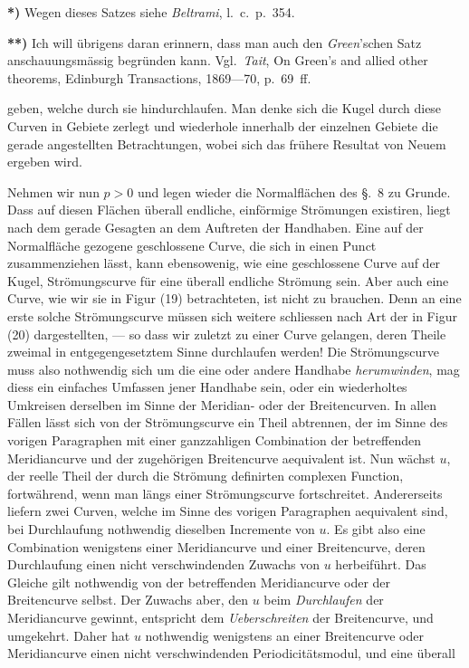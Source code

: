 \documentclass{article}
\begin{document}
\textbf{*)} Wegen dieses Satzes siehe \emph{Beltrami}, l.\ c.\ p.~354.

\textbf{**)} Ich will übrigens daran erinnern, dass man auch den \emph{Green}'schen Satz anschauungsmässig begründen kann. Vgl.\ \emph{Tait}, On Green's and allied other theorems, Edinburgh Transactions, 1869---70, p.~69~ff.

geben, welche durch sie hindurchlaufen. Man denke sich die Kugel durch diese Curven in Gebiete zerlegt und wiederhole innerhalb der einzelnen Gebiete die gerade angestellten Betrachtungen, wobei sich das frühere Resultat von Neuem ergeben wird.

Nehmen wir nun $p > 0$ und legen wieder die Normalflächen des §.~8 zu Grunde. Dass auf diesen Flächen überall endliche, einförmige Strömungen existiren, liegt nach dem gerade Gesagten an dem Auftreten der Handhaben. Eine auf der Normalfläche gezogene geschlossene Curve, die sich in einen Punct zusammenziehen lässt, kann ebensowenig, wie eine geschlossene Curve auf der Kugel, Strömungscurve für eine überall endliche Strömung sein. Aber auch eine Curve, wie wir sie in Figur (19) betrachteten, ist nicht zu brauchen. Denn an eine erste solche Strömungscurve müssen sich weitere schliessen nach Art der in Figur (20) dargestellten, --- so dass wir zuletzt zu einer Curve gelangen, deren Theile zweimal in entgegengesetztem Sinne durchlaufen werden! Die Strömungscurve muss also nothwendig sich um die eine oder andere Handhabe \emph{herumwinden}, mag diess ein einfaches Umfassen jener Handhabe sein, oder ein wiederholtes Umkreisen derselben im Sinne der Meridian- oder der Breitencurven. In allen Fällen lässt sich von der Strömungscurve ein Theil abtrennen, der im Sinne des vorigen Paragraphen mit einer ganzzahligen Combination der betreffenden Meridiancurve und der zugehörigen Breitencurve aequivalent ist. Nun wächst $u$, der reelle Theil der durch die Strömung definirten complexen Function, fortwährend, wenn man längs einer Strömungscurve fortschreitet. Andererseits liefern zwei Curven, welche im Sinne des vorigen Paragraphen aequivalent sind, bei Durchlaufung nothwendig dieselben Incremente von $u$. Es gibt also eine Combination wenigstens einer Meridiancurve und einer Breitencurve, deren Durchlaufung einen nicht verschwindenden Zuwachs von $u$ herbeiführt. Das Gleiche gilt nothwendig von der betreffenden Meridiancurve oder der Breitencurve selbst. Der Zuwachs aber, den $u$ beim \emph{Durchlaufen} der Meridiancurve gewinnt, entspricht dem \emph{Ueberschreiten} der Breitencurve, und umgekehrt. Daher hat $u$ nothwendig wenigstens an einer Breitencurve oder Meridiancurve einen nicht verschwindenden Periodicitätsmodul, und eine überall
\end{document}
